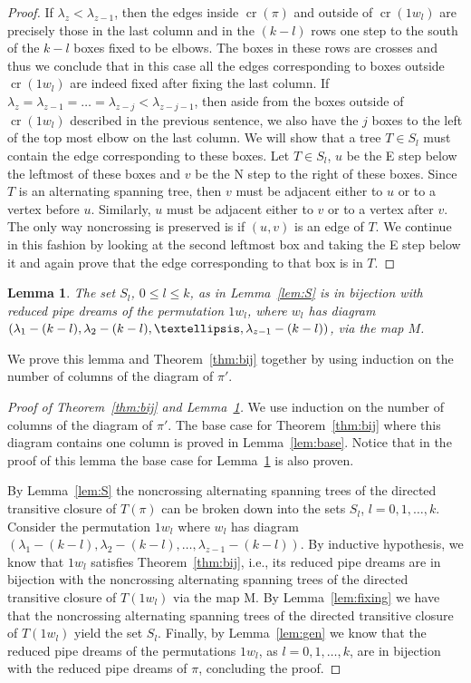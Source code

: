 \documentclass[10pt]{amsart}
\newtheorem{lemm}[theo]{Lemma}
\theoremstyle{definition}
\numberwithin{equation}{section}
\DeclareMathOperator{\rmcr}{cr}
\newcommand*\+{\smash{\lower2pt\hbox{\rlap{\vrule height14pt}}\raise2pt\hbox{\rlap{\hskip-3pt \vrule height.4pt depth0pt width14.7pt}}}}
\begin{document}
\begin{proof}
If $\lambda_z<\lambda_{z-1}$, then the edges inside $\rmcr(\pi)$ and outside of $\rmcr(1w_l)$ are precisely those in the last column and in the $(k-l)$ rows one step to the south of the $k-l$ boxes fixed to be elbows. The boxes in these rows are crosses and thus we conclude that in this case all the edges corresponding to boxes outside $\rmcr(1w_l)$ are indeed fixed after fixing the last column. If $\lambda_z=\lambda_{z-1}=\dots=\lambda_{z-j}<\lambda_{z-j-1}$, then aside from the boxes outside of $\rmcr(1w_l)$ described in the previous sentence, we also have the $j$ boxes to the left of the top most elbow on the last column. We will show that a tree $T\in S_l$ must contain the edge corresponding to these boxes. Let $T\in S_l$, $u$ be the E step below the leftmost of these boxes and $v$ be the N step to the right of these boxes. Since $T$ is an alternating spanning tree, then $v$ must be adjacent either to $u$ or to a vertex before $u$. Similarly, $u$ must be adjacent either to $v$ or to a vertex after $v$. The only way noncrossing is preserved is if $(u,v)$ is an edge of $T$. We continue in this fashion by looking at the second leftmost box and taking the E step below it and again prove that the edge corresponding to that box is in $T$.
\end{proof}

\begin{lemm}\label{lem:l}
The set $S_l$, $0\leq l\leq k$, as in Lemma~\ref{lem:S} is in bijection with reduced pipe dreams of the permutation $1w_l$, where $w_l$ has diagram $(\lambda_1-(k-l), \lambda_2-\linebreak(k-l), \dots, \lambda_{z-1}-(k-l))$, via the map $M$.
\end{lemm}

We prove this lemma and Theorem~\ref{thm:bij} together by using induction on the number of columns of the diagram of $\pi'$.

\begin{proof}[Proof of Theorem~\ref{thm:bij} and Lemma~\ref{lem:l}]
We use induction on the number of columns of the diagram of $\pi'$. The base case for Theorem~\ref{thm:bij} where this diagram contains one column is proved in Lemma~\ref{lem:base}. Notice that in the proof of this lemma the base case for Lemma~\ref{lem:l} is also proven.

By Lemma~\ref{lem:S} the noncrossing alternating spanning trees of the directed transitive closure of $T(\pi)$ can be broken down into the sets $S_l$, $l=0,1,\dots, k$. Consider the permutation $1w_l$ where $w_l$ has diagram $(\lambda_1-(k-l), \lambda_2-(k-l), \dots, \lambda_{z-1}-(k-l))$. By inductive hypothesis, we know that $1w_l$ satisfies Theorem~\ref{thm:bij}, i.e., its reduced pipe dreams are in bijection with the noncrossing alternating spanning trees of the directed transitive closure of $T(1w_l)$ via the map M. By Lemma~\ref{lem:fixing} we have that the noncrossing alternating spanning trees of the directed transitive closure of $T(1w_l)$ yield the set $S_l$. Finally, by Lemma~\ref{lem:gen} we know that the reduced pipe dreams of the permutations $1w_l$, as $l=0,1,\dots, k$, are in bijection with the reduced pipe dreams of $\pi$, concluding the proof.
\end{proof}
\end{document}
